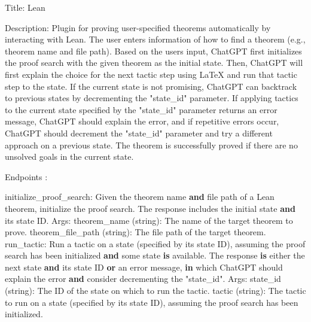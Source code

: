 \documentclass[
]{article}
\newenvironment{Shaded}{}{}
\newcommand{\BuiltInTok}[1]{\textcolor[rgb]{0.00,0.50,0.00}{#1}}
\newcommand{\KeywordTok}[1]{\textcolor[rgb]{0.00,0.44,0.13}{\textbf{#1}}}
\newcommand{\NormalTok}[1]{#1}
\newcommand{\StringTok}[1]{\textcolor[rgb]{0.25,0.44,0.63}{#1}}
\begin{document}
Title: Lean

\begin{Shaded}
\begin{Highlighting}[]
\NormalTok{Description: Plugin for proving user{-}specified theorems automatically by interacting with Lean. The user enters information of how to find a theorem (e.g., theorem name and file path). Based on the user\textquotesingle{}s input, ChatGPT first initializes the proof search with the given theorem as the initial state. Then, ChatGPT will first explain the choice for the next tactic step using LaTeX and run that tactic step to the state. If the current state is not promising, ChatGPT can backtrack to previous states by decrementing the "state\_id" parameter. If applying tactics to the current state specified by the "state\_id" parameter returns an error message, ChatGPT should explain the error, and if repetitive errors occur, ChatGPT should decrement the "state\_id" parameter and try a different approach on a previous state. The theorem is successfully proved if there are no unsolved goals in the current state. }
\end{Highlighting}
\end{Shaded}

Endpoints :

\begin{Shaded}
\begin{Highlighting}[]
\NormalTok{initialize\_proof\_search: Given the theorem name }\KeywordTok{and} \BuiltInTok{file}\NormalTok{ path of a Lean theorem, initialize the proof search. The response includes the initial state }\KeywordTok{and}\NormalTok{ its state ID.}
\NormalTok{Args:}
\NormalTok{    theorem\_name (string): The name of the target theorem to prove.}
\NormalTok{    theorem\_file\_path (string): The }\BuiltInTok{file}\NormalTok{ path of the target theorem.}
\NormalTok{run\_tactic: Run a tactic on a state (specified by its state ID), assuming the proof search has been initialized }\KeywordTok{and}\NormalTok{ some state }\KeywordTok{is}\NormalTok{ available. The response }\KeywordTok{is}\NormalTok{ either the }\BuiltInTok{next}\NormalTok{ state }\KeywordTok{and}\NormalTok{ its state ID }\KeywordTok{or}\NormalTok{ an error message, }\KeywordTok{in}\NormalTok{ which ChatGPT should explain the error }\KeywordTok{and}\NormalTok{ consider decrementing the }\StringTok{"state\_id"}\NormalTok{.}
\NormalTok{Args:}
\NormalTok{    state\_id (string): The ID of the state on which to run the tactic.}
\NormalTok{    tactic (string): The tactic to run on a state (specified by its state ID), assuming the proof search has been initialized. }
\end{Highlighting}
\end{Shaded}
\end{document}
